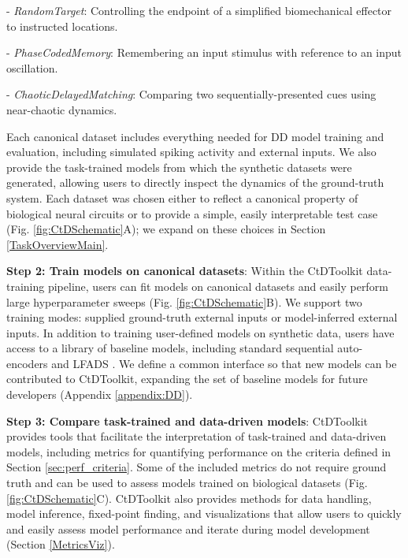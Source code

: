 \documentclass{article}
\begin{document}
\hspace*{2em}- \textit{RandomTarget}: Controlling the endpoint of a simplified biomechanical effector to instructed locations.

\hspace*{2em}- \textit{PhaseCodedMemory}: Remembering an input stimulus with reference to an input oscillation.

\hspace*{2em}- \textit{ChaoticDelayedMatching}: Comparing two sequentially-presented cues using near-chaotic dynamics.


Each canonical dataset includes everything needed for DD model training and evaluation, including simulated spiking activity and external inputs. We also provide the task-trained models from which the synthetic datasets were generated, allowing users to directly inspect the dynamics of the ground-truth system. Each dataset was chosen either to reflect a canonical property of biological neural circuits or to provide a simple, easily interpretable test case (Fig. \ref{fig:CtDSchematic}A); we expand on these choices in Section \ref{TaskOverviewMain}.

\textbf{Step 2: Train models on canonical datasets}: Within the CtDToolkit data-training pipeline, users can fit models on canonical datasets and easily perform large hyperparameter sweeps (Fig. \ref{fig:CtDSchematic}B). We support two training modes: supplied ground-truth external inputs or model-inferred external inputs. In addition to training user-defined models on synthetic data, users have access to a library of baseline models, including standard sequential auto-encoders and LFADS \cite{pandarinath_inferring_2018}. We define a common interface so that new models can be contributed to CtDToolkit, expanding the set of baseline models for future developers (Appendix \ref{appendix:DD}).

\textbf{Step 3: Compare task-trained and data-driven models}: CtDToolkit provides tools that facilitate the interpretation of task-trained and data-driven models, including metrics for quantifying performance on the criteria defined in Section \ref{sec:perf_criteria}. Some of the included metrics do not require ground truth and can be used to assess models trained on biological datasets (Fig. \ref{fig:CtDSchematic}C). CtDToolkit also provides methods for data handling, model inference, fixed-point finding, and visualizations that allow users to quickly and easily assess model performance and iterate during model development (Section \ref{MetricsViz}).
\end{document}
